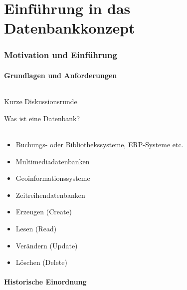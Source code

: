 \part{Einf\"uhrung in das Datenbankkonzept}
\label{part:grundlagen}

\section{Motivation und Einführung}

\subsection{Grundlagen und Anforderungen}

\begin{frame}{\insertsection}
	\framesubtitle{\insertsubsection}
	\begin{alertblock}{\Large Kurze Diskussionsrunde}
	\begin{center}
		\Large{Was ist eine Datenbank?}
	\end{center}		
	\end{alertblock}
\end{frame}

\begin{frame}{\insertsection}
\framesubtitle{\insertsubsection}
\begin{itemize}
	\item Buchungs- oder Bibliothekssysteme, ERP-Systeme etc.
	\item Multimediadatenbanken
	\item Geoinformationssysteme
	\item Zeitreihendatenbanken
\end{itemize}
\onslide\pause
\abs 
{}
\begin{itemize}
	\item Erzeugen (Create)
	\item Lesen (Read)
	\item Verändern (Update)
	\item Löschen (Delete)
\end{itemize}
\end{frame}

\subsection{Historische Einordnung}

